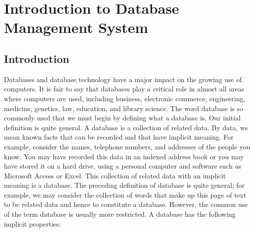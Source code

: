 \chapter{Introduction to Database Management System}
\section{Introduction}
Databases and database technology have a major impact on the growing use of computers. It is fair to say that databases play a critical role in almost all areas where computers are used, including business, electronic commerce, engineering, medicine, genetics, law, education, and library science. The word database is so commonly used that we must begin by defining what a database is. Our initial definition is quite general. A database is a collection of related data. By data, we mean known facts that can be recorded and that have implicit meaning. For example, consider the names, telephone numbers, and addresses of the people you know. You may have recorded this data in an indexed address book or you may have stored it on a hard drive, using a personal computer and software such as Microsoft Access or Excel. This collection of related data with an implicit meaning is a database. The preceding definition of database is quite general; for example, we may consider the collection of words that make up this page of text to be related data and hence to constitute a database. However, the common use of the term database is usually more restricted. 
A database has the following implicit properties:

